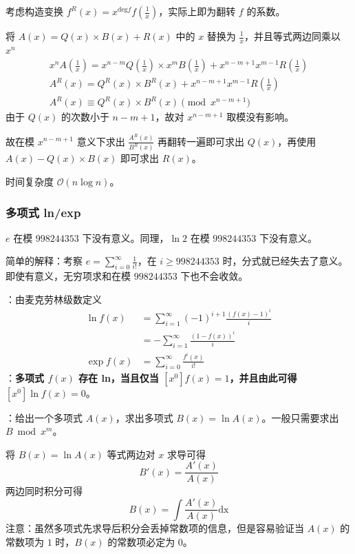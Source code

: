 考虑构造变换 $f^R(x) = x^{\mathrm{deg} f} f\left(\frac{1}{x}\right)$，实际上即为翻转 $f$ 的系数。

将 $A(x) = Q(x) \times B(x) + R(x)$ 中的 $x$ 替换为 $\frac{1}{x}$，并且等式两边同乘以 $x^n$
\[
\begin{gathered}
x^nA\left(\frac{1}{x}\right) = x^{n - m}Q\left(\frac{1}{x}\right) \times x^mB\left(\frac{1}{x}\right) + x^{n - m + 1}x^{m - 1} R\left(\frac{1}{x}\right) \\
A^R(x) = Q^R(x) \times B^R(x) + x^{n - m + 1}x^{m - 1}R\left(\frac{1}{x}\right) \\
A^R(x) \equiv Q^R(x) \times B^R(x) \pmod{x^{n - m + 1}}
\end{gathered}
\]
由于 $Q(x)$ 的次数小于 $n - m + 1$，故对 $x^{n - m + 1}$ 取模没有影响。

故在模 $x^{n - m + 1}$ 意义下求出 $\frac{A^R(x)}{B^R(x)}$ 再翻转一遍即可求出 $Q(x)$，再使用 $A(x) - Q(x) \times B(x)$ 即可求出 $R(x)$。

时间复杂度 $\mathcal{O}(n \log n)$。

\subsubsection{多项式 ln/exp}

\begin{quoteblock}
$e$ 在模 $998244353$ 下没有意义。同理，$\ln 2$ 在模 $998244353$ 下没有意义。

简单的解释：考察 $e = \sum_{i = 0}^\infty \frac{1}{i!}$，在 $i \geq 998244353$ 时，分式就已经失去了意义。即使有意义，无穷项求和在模 $998244353$ 下也不会收敛。
\end{quoteblock}

：由麦克劳林级数定义
\[
\begin{aligned}
\ln f(x) & = \sum\limits_{i = 1}^{\infty} (-1)^{i + 1} \frac{(f(x) - 1)^i}{i} \\
& = - \sum\limits_{i = 1}^{\infty} \frac{(1 - f(x))^i}{i} \\
\exp f(x) & = \sum\limits_{i = 0}^{\infty} \frac{f^i(x)}{i!}
\end{aligned}
\]
：\textbf{多项式 $f(x)$ 存在 ln，当且仅当 $[x^0]f(x) = 1$，并且由此可得 $[x^0] \ln f(x) = 0$}。

：给出一个多项式 $A(x)$，求出多项式 $B(x) = \ln A(x)$。一般只需要求出 $B \bmod{x^m}$。

将 $B(x) = \ln A(x)$ 等式两边对 $x$ 求导可得
\[
B'(x) = \frac{A'(x)}{A(x)}
\]
两边同时积分可得
\[
B(x) = \int \frac{A'(x)}{A(x)} \mathrm{dx}
\]
注意：虽然多项式先求导后积分会丢掉常数项的信息，但是容易验证当 $A(x)$ 的常数项为 $1$ 时，$B(x)$ 的常数项必定为 $0$。

